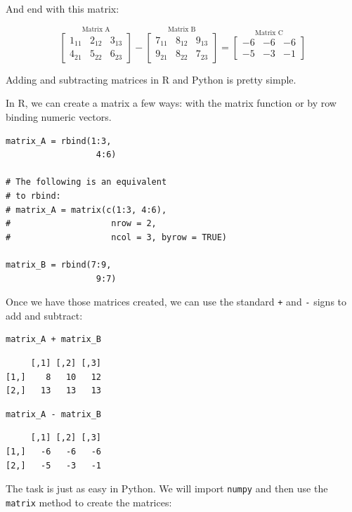 \documentclass[
  letterpaper,
]{krantz}
\begin{document}
And end with this matrix:

\[
\stackrel{\mbox{Matrix A}}{
\begin{bmatrix}
1_{11} & 2_{12} & 3_{13}\\
4_{21} & 5_{22} & 6_{23}
\end{bmatrix}
}
-
\stackrel{\mbox{Matrix B}}{
\begin{bmatrix}
7_{11} & 8_{12} & 9_{13}\\
9_{21} & 8_{22} & 7_{23}
\end{bmatrix} 
}
=
\stackrel{\mbox{Matrix C}}{
\begin{bmatrix}
-6 & -6 & -6 \\
-5 & -3 & -1
\end{bmatrix}
}
\]

Adding and subtracting matrices in R and Python is pretty simple.

In R, we can create a matrix a few ways: with the matrix function or by
row binding numeric vectors.

\begin{verbatim}
matrix_A = rbind(1:3, 
                  4:6)

# The following is an equivalent
# to rbind:
# matrix_A = matrix(c(1:3, 4:6), 
#                    nrow = 2, 
#                    ncol = 3, byrow = TRUE)

matrix_B = rbind(7:9, 
                  9:7)
\end{verbatim}

Once we have those matrices created, we can use the standard \texttt{+}
and \texttt{-} signs to add and subtract:

\begin{verbatim}
matrix_A + matrix_B
\end{verbatim}

\begin{verbatim}
     [,1] [,2] [,3]
[1,]    8   10   12
[2,]   13   13   13
\end{verbatim}

\begin{verbatim}
matrix_A - matrix_B
\end{verbatim}

\begin{verbatim}
     [,1] [,2] [,3]
[1,]   -6   -6   -6
[2,]   -5   -3   -1
\end{verbatim}

The task is just as easy in Python. We will import \texttt{numpy} and
then use the \texttt{matrix} method to create the matrices:
\end{document}
